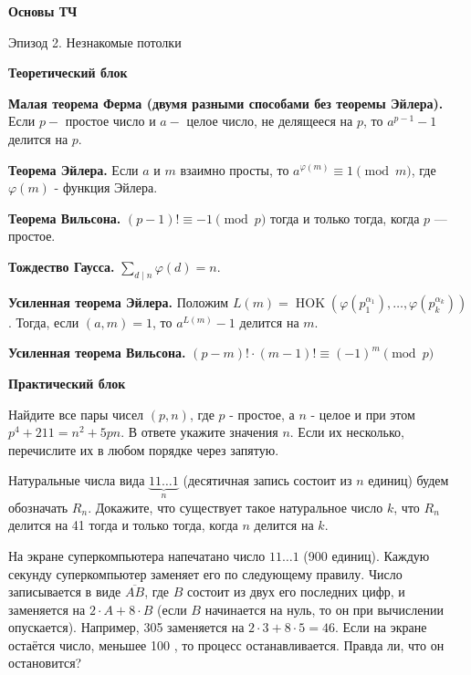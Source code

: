 \centerline{\bf \Huge Основы ТЧ}

\begin{flushright}
        \scriptsize{Эпизод 2. Незнакомые потолки}
\end{flushright}

\textbf{\large Теоретический блок}

\textbf{Малая теорема Ферма (двумя разными способами без теоремы Эйлера).}
Если $p-$ простое число и $a-$ целое число, не делящееся на $p$, то $a^{p-1}-1$ делится на $p$.

\textbf{Теорема Эйлера.}
Если $a$ и $m$ взаимно просты, то $a^{\varphi(m)} \equiv 1\pmod{m}$, где $\varphi(m)$ - функция Эйлера.

\textbf{Теорема Вильсона.}
$(p-1)!\equiv-1\pmod{p}$ тогда и только тогда, когда $p$ --- простое.

\textbf{Тождество Гаусса.}
$\sum_{d \mid n} \varphi(d)=n$.

\textbf{Усиленная теорема Эйлера.}
Положим $L(m)=\operatorname{HOK}\left(\varphi\left(p_1^{\alpha_1}\right), \ldots, \varphi\left(p_k^{\alpha_k}\right)\right)$. Тогда, если $(a, m)=1$, то $a^{L(m)}-1$ делится на $m$.

\textbf{Усиленная теорема Вильсона.}
$(p-m)!\cdot(m-1)!\equiv(-1)^m \pmod{p}$

\textbf{\large Практический блок}

Найдите все пары чисел $(p, n)$, где $p$ - простое, а $n$ - целое и при этом $p^4+211=n^2+5 p n$. В ответе укажите значения $n$. Если их несколько, перечислите их в любом порядке через запятую.

Натуральные числа вида $\underbrace{11 \ldots 1}_n$ (десятичная запись состоит из $n$ единиц) будем обозначать $R_n$. Докажите, что существует такое натуральное число $k$, что $R_n$ делится на 41 тогда и только тогда, когда $n$ делится на $k$.

На экране суперкомпьютера напечатано число $11 \ldots 1$ (900 единиц). Каждую секунду суперкомпьютер заменяет его по следующему правилу. Число записывается в виде $\overline{A B}$, где $B$ состоит из двух его последних цифр, и заменяется на $2 \cdot A+8 \cdot B$ (если $B$ начинается на нуль, то он при вычислении опускается). Например, 305 заменяется на $2 \cdot 3+8 \cdot 5=46$. Если на экране остаётся число, меньшее 100 , то процесс останавливается. Правда ли, что он остановится?

\newpage

